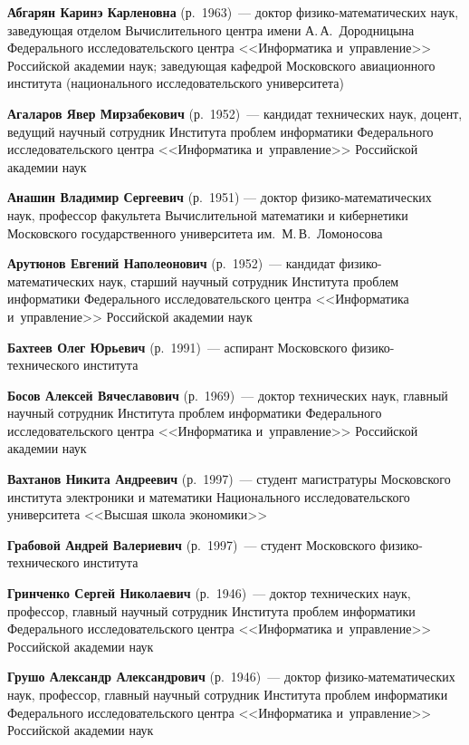 \begin{multicols}{2}

\noindent
\textbf{Абгарян Каринэ Карленовна} (р.\ 1963)~--- 
доктор фи\-зи\-ко-ма\-те\-ма\-ти\-че\-ских наук, за\-ве\-ду\-ющая 
отделом Вычислительного центра имени А.\,А.~Дородницына 
Федерального исследовательского центра <<Информатика и~управ\-ле\-ние>>
Российской академии наук; за\-ве\-ду\-ющая кафедрой Московского авиационного 
института (национального исследовательского университета)

\noindent
\textbf{Агаларов Явер Мирзабекович} (р.\ 1952)~--- 
кандидат технических наук, доцент, ведущий научный сотрудник Института 
проб\-лем информатики Федерального исследовательского центра <<Информатика 
и~управ\-ле\-ние>> Российской академии наук

\noindent
\textbf{Анашин Владимир Сергеевич} (р.\ 1951) --- доктор фи\-зи\-ко-ма\-те\-ма\-ти\-че\-ских
 наук, профессор факультета Вычислительной математики и кибернетики Московского
 государственного университета   им.\  М.\,В.~Ломоносова

 \noindent
\textbf{Арутюнов Евгений Наполеонович} (р.\ 1952)~--- 
кандидат фи\-зи\-ко-ма\-те\-ма\-ти\-че\-ских наук, старший научный со\-труд\-ник 
Института проб\-лем информатики Федерального исследовательского центра 
<<Информатика и~управ\-ле\-ние>> Российской академии наук

\noindent
\textbf{Бахтеев Олег Юрьевич} (р.\ 1991)~--- 
аспирант Мос\-ков\-ско\-го фи\-зи\-ко-тех\-ни\-че\-ско\-го института 

\noindent
\textbf{Босов Алексей Вячеславович} (р.\ 1969)~--- 
доктор технических наук, главный научный сотрудник Института проб\-лем 
информатики Федерального исследовательского центра <<Информатика и~управ\-ле\-ние>>
Российской академии наук 


\noindent
\textbf{Вахтанов Никита Андреевич} (р.\ 1997)~---  
студент магистратуры  Московского института электроники и математики 
Национального исследовательского университета <<Высшая школа экономики>>

\noindent
\textbf{Грабовой Андрей Валериевич} (р.\ 1997)~--- 
студент Московского фи\-зи\-ко-тех\-ни\-че\-ско\-го института

\noindent
\textbf{Гринченко Сергей Николаевич} (р.\ 1946)~--- 
доктор технических наук, профессор, главный научный сотрудник Института проб\-лем 
информатики Федерального исследовательского центра <<Информатика и~управ\-ле\-ние>>
Российской академии наук

\noindent
\textbf{Грушо Александр Александрович} (р.\ 1946)~--- 
доктор фи\-зи\-ко-ма\-те\-ма\-ти\-че\-ских наук, профессор, главный научный 
сотрудник Института проб\-лем информатики Федерального исследовательского центра 
<<Информатика и~управ\-ле\-ние>> Российской академии наук


\end{multicols}
